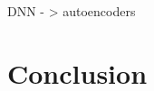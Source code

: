 \documentclass{article}
\begin{document}
DNN - > autoencoders


\section{Conclusion} 
 
 




\end{document}
